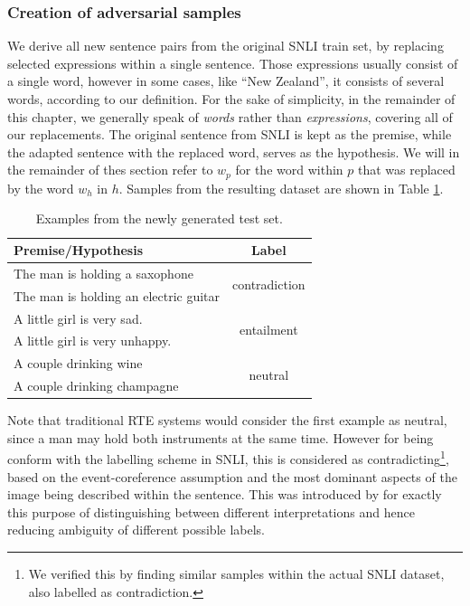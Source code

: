\subsubsection{Creation of adversarial samples}
We derive all new sentence pairs from the original \ac{SNLI} train set, by replacing selected expressions within a single sentence. Those expressions usually consist of a single word, however in some cases, like ``New Zealand'', it consists of several words, according to our definition. For the sake of simplicity, in the remainder of this chapter, we generally speak of \textit{words} rather than \textit{expressions}, covering all of our replacements. The original sentence from \ac{SNLI} is kept as the premise, while the adapted sentence with the replaced word, serves as the hypothesis. We will in the remainder of thes section refer to $w_p$ for the word within $p$ that was replaced by the word $w_h$ in $h$. Samples from the resulting dataset are shown in Table \ref{tab:new_testset_samples}.
\begin{table}[htt]
\centering
\begin{tabular}{lc}
\toprule
	\textbf{Premise/Hypothesis} & \textbf{Label} \\  \midrule
		The man is holding a saxophone & \multirow{2}{*}{contradiction} \\
        The man is holding an electric guitar & \\
        \midrule
		A little girl is very sad. & \multirow{2}{*}{entailment} \\ 
        A little girl is very unhappy.&  \\
        \midrule
		A couple drinking wine & \multirow{2}{*}{neutral} \\
        A couple drinking champagne &  \\
    \bottomrule
  \end{tabular}
  \label{tab:new_testset_samples}
  \caption{Examples from the newly generated test set.}
\end{table}
Note that traditional \ac{RTE} systems would consider the first example as neutral, since a man may hold both instruments at the same time. However for being conform with the labelling scheme in \ac{SNLI}, this is considered as contradicting\footnote{We verified this by finding similar samples within the actual \ac{SNLI} dataset, also labelled as contradiction.}, based on the event-coreference assumption and the most dominant aspects of the image being  described within the sentence. This was introduced by \cite{bowman2015large} for exactly this purpose of distinguishing between different interpretations and hence reducing ambiguity of different possible labels.

